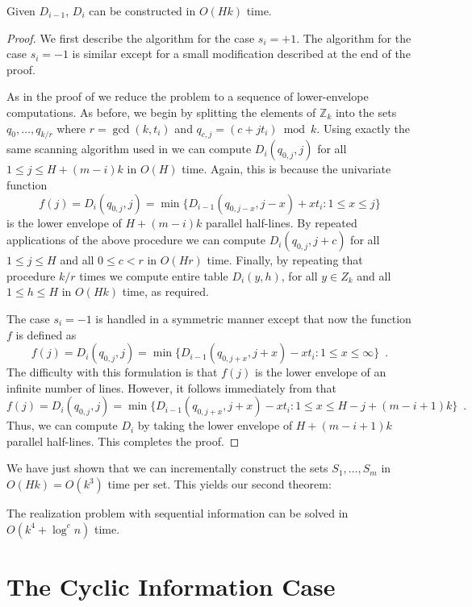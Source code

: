 \documentclass[11pt]{patmorin}
\newcommand{\Z}{\mathbb{Z}}
\begin{document}
\begin{lem}
Given $D_{i-1}$, $D_i$ can be constructed in $O(Hk)$ time.
\end{lem}

\begin{proof}
We first describe the algorithm for the case $s_i=+1$. The algorithm
for the case $s_i=-1$ is similar except for a small modification
described at the end of the proof.

As in the proof of  we reduce the problem to a 
sequence of lower-envelope
computations.   As before, we begin by
splitting the elements of $\Z_k$ into the sets
$q_{0},\ldots,q_{k/r}$ where $r=\gcd(k,t_i)$ and
$q_{c,j}=(c+jt_i)\bmod k$.
Using exactly the same scanning algorithm used in  we
can compute $D_i(q_{0,j},j)$ for all $1\le j\le H+(m-i)k$ in $O(H)$ time.
Again, this is because the univariate function
\[ f(j) = D_i(q_{0,j},j) = \min\{ D_{i-1}(q_{0,j-x},j-x) + xt_i : 1\le
x\le j\} 
\]
is the lower envelope of $H+(m-i)k$ parallel half-lines.
By repeated applications of the above procedure we can compute
$D_i(q_{0,j},j+c)$ for all $1\le j\le H$ and all
$0\le c< r$ in $O(Hr)$ time.  Finally, by repeating that
procedure $k/r$ times we compute entire table $D_i(y,h)$, for all
$y\in Z_k$ and all $1\le h\le H$ in $O(Hk)$ time, as required. 

The case $s_{i}=-1$ is handled in a symmetric manner except that now
the function $f$ is defined as
\[
  f(j) = D_{i}(q_{0,j},j) = \min\{D_{i-1}(q_{0,j+x},j+x) - xt_i :
1\le x\le \infty\} \enspace .
\]
The difficulty with this formulation is that $f(j)$ is the lower
envelope of an infinite number of lines.  However, it follows immediately from  that 
\[
  f(j) = D_{i}(q_{0,j},j) = \min\{D_{i-1}(q_{0,j+x},j+x) - xt_i :
1\le x\le H-j+(m-i+1)k\} \enspace .
\]
Thus, we can compute $D_i$ by taking the lower envelope of
$H+(m-i+1)k$ parallel half-lines.  This completes the proof.
\end{proof}

We have just shown that we can incrementally construct the sets
$S_1,\ldots,S_m$ in $O(Hk)=O(k^3)$ time per set.  This yields our
second theorem:

\begin{thm}
The realization problem with sequential information can be solved in
$O(k^4+\log^c n)$ time.
\end{thm}


\section{The Cyclic Information Case}
\end{document}
